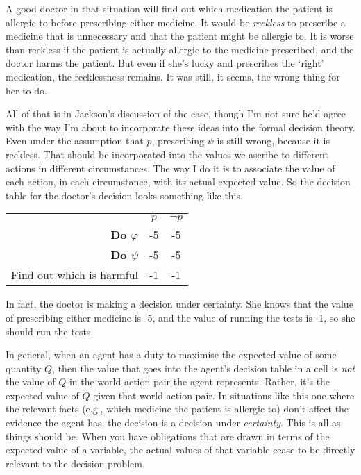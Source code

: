 A good doctor in that situation will find out which medication the patient is allergic to before prescribing either medicine. It would be \textit{reckless} to prescribe a medicine that is unnecessary and that the patient might be allergic to. It is worse than reckless if the patient is actually allergic to the medicine prescribed, and the doctor harms the patient. But even if she's lucky and prescribes the `right' medication, the recklessness remains. It was still, it seems, the wrong thing for her to do.

All of that is in Jackson's discussion of the case, though I'm not sure he'd agree with the way I'm about to incorporate these ideas into the formal decision theory. Even under the assumption that $p$, prescribing $\psi$ is still wrong, because it is reckless. That should be incorporated into the values we ascribe to different actions in different circumstances. The way I do it is to associate the value of each action, in each circumstance, with its actual expected value. So the decision table for the doctor's decision looks something like this.

\begin{center}
\begin{tabular}{r c c}
 & $p$ & $\neg p$ \\
\textbf{Do $\varphi$} & -5 & -5 \\
\textbf{Do $\psi$} & -5 & -5 \\
Find out which is harmful & -1 & -1 \\
\end{tabular}
\end{center}

\noindent In fact, the doctor is making a decision under certainty. She knows that the value of prescribing either medicine is -5, and the value of running the tests is -1, so she should run the tests.

In general, when an agent has a duty to maximise the expected value of some quantity $Q$, then the value that goes into the agent's decision table in a cell is \textit{not} the value of $Q$ in the world-action pair the agent represents. Rather, it's the expected value of $Q$ given that world-action pair. In situations like this one where the relevant facts (e.g., which medicine the patient is allergic to) don't affect the evidence the agent has, the decision is a decision under \textit{certainty}. This is all as things should be. When you have obligations that are drawn in terms of the expected value of a variable, the actual values of that variable cease to be directly relevant to the decision problem.

